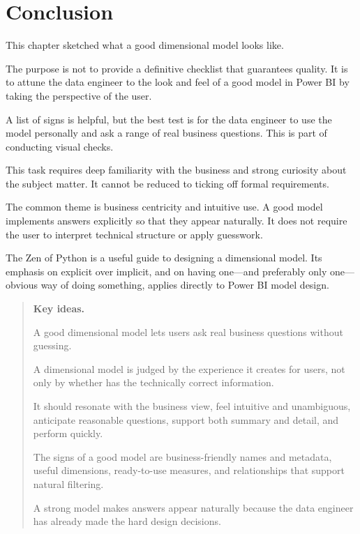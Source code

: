 \documentclass[10pt,openany,10pt]{book}
\begin{document}
\section{Conclusion}\label{conclusion-1}

This chapter sketched what a good dimensional model looks like.

The purpose is not to provide a definitive checklist that guarantees
quality. It is to attune the data engineer to the look and feel of a
good model in Power BI by taking the perspective of the user.

A list of signs is helpful, but the best test is for the data engineer
to use the model personally and ask a range of real business questions.
This is part of conducting visual checks.

This task requires deep familiarity with the business and strong
curiosity about the subject matter. It cannot be reduced to ticking off
formal requirements.

The common theme is business centricity and intuitive use. A good model
implements answers explicitly so that they appear naturally. It does not
require the user to interpret technical structure or apply guesswork.

The Zen of Python is a useful guide to designing a dimensional model.
Its emphasis on explicit over implicit, and on having one---and
preferably only one---obvious way of doing something, applies directly
to Power BI model design.

\begin{quote}
\textbf{Key ideas.}

A good dimensional model lets users ask real business questions without
guessing.

A dimensional model is judged by the experience it creates for users,
not only by whether has the technically correct information.

It should resonate with the business view, feel intuitive and
unambiguous, anticipate reasonable questions, support both summary and
detail, and perform quickly.

The signs of a good model are business-friendly names and metadata,
useful dimensions, ready-to-use measures, and relationships that support
natural filtering.

A strong model makes answers appear naturally because the data engineer
has already made the hard design decisions.
\end{quote}

\newpage
\end{document}
